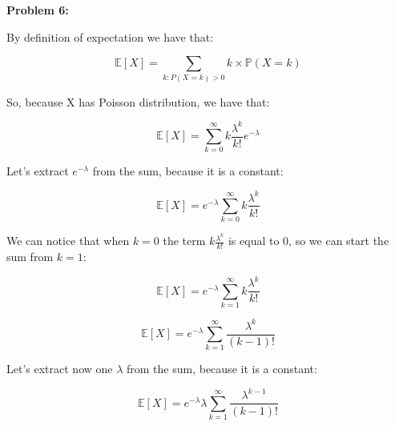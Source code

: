 \textbf{Problem 6:}

\singlespacing

By definition of expectation we have that:

\singlespacing

\begin{equation}
    \mathbb{E}[X] = \sum_{k: P(X = k) > 0} k \times \mathbb{P}(X = k)
\end{equation}

\singlespacing

So, because X has Poisson distribution, we have that:

\singlespacing

\begin{equation}
    \mathbb{E}[X] = \sum_{k=0}^{\infty} k \frac{\lambda^k}{k!}e^{-\lambda}
\end{equation}

\singlespacing

Let's extract $e^{-\lambda}$ from the sum, because it is a constant:

\singlespacing

\begin{equation}
    \mathbb{E}[X] = e^{-\lambda} \sum_{k=0}^{\infty} k \frac{\lambda^k}{k!}
\end{equation}

\singlespacing

We can notice that when $k = 0$ the term $k \frac{\lambda^k}{k!}$ is equal to $0$,
so we can start the sum from $k = 1$:

\singlespacing

\begin{equation}
    \mathbb{E}[X] = e^{-\lambda} \sum_{k=1}^{\infty} k \frac{\lambda^k}{k!}
\end{equation}

\singlespacing

\begin{equation}
    \mathbb{E}[X] = e^{-\lambda} \sum_{k=1}^{\infty} \frac{\lambda^k}{(k-1)!}
\end{equation}

\singlespacing

Let's extract now one $\lambda$ from the sum, because it is a constant:

\singlespacing

\begin{equation}
    \mathbb{E}[X] = e^{-\lambda} \lambda \sum_{k=1}^{\infty} \frac{\lambda^{k-1}}{(k-1)!}
\end{equation}

